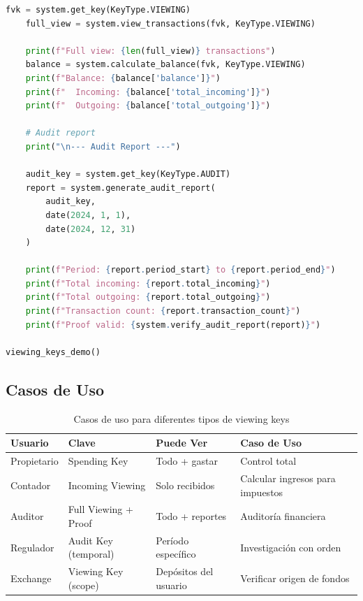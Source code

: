 \documentclass[11pt,a4paper,twoside]{book}
\theoremstyle{definition}
\theoremstyle{remark}
\begin{document}
\begin{lstlisting}[language=Python, caption={Sistema de Viewing Keys y Audit Keys}]
    fvk = system.get_key(KeyType.VIEWING)
    full_view = system.view_transactions(fvk, KeyType.VIEWING)
    
    print(f"Full view: {len(full_view)} transactions")
    balance = system.calculate_balance(fvk, KeyType.VIEWING)
    print(f"Balance: {balance['balance']}")
    print(f"  Incoming: {balance['total_incoming']}")
    print(f"  Outgoing: {balance['total_outgoing']}")
    
    # Audit report
    print("\n--- Audit Report ---")
    
    audit_key = system.get_key(KeyType.AUDIT)
    report = system.generate_audit_report(
        audit_key,
        date(2024, 1, 1),
        date(2024, 12, 31)
    )
    
    print(f"Period: {report.period_start} to {report.period_end}")
    print(f"Total incoming: {report.total_incoming}")
    print(f"Total outgoing: {report.total_outgoing}")
    print(f"Transaction count: {report.transaction_count}")
    print(f"Proof valid: {system.verify_audit_report(report)}")

viewing_keys_demo()
\end{lstlisting}

\subsection{Casos de Uso}

\begin{table}[htbp]
\centering
\small
\begin{tabular}{lp{3cm}p{3cm}p{3.5cm}}
\toprule
\textbf{Usuario} & \textbf{Clave} & \textbf{Puede Ver} & \textbf{Caso de Uso} \\
\midrule
Propietario & Spending Key & Todo + gastar & Control total \\
Contador & Incoming Viewing & Solo recibidos & Calcular ingresos para impuestos \\
Auditor & Full Viewing + Proof & Todo + reportes & Auditoría financiera \\
Regulador & Audit Key (temporal) & Período específico & Investigación con orden \\
Exchange & Viewing Key (scope) & Depósitos del usuario & Verificar origen de fondos \\
\bottomrule
\end{tabular}
\caption{Casos de uso para diferentes tipos de viewing keys}
\end{table}

\end{document}
